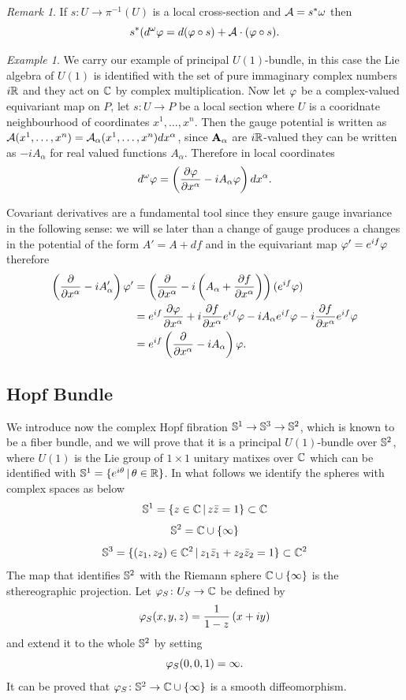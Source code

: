 \documentclass{article}
\theoremstyle{definition}
\theoremstyle{remark}
\newtheorem{rmk}{Remark}
\newtheorem{ex}{Example}
\begin{document}
\begin{rmk}
    If \(s\colon U\to\pi^{-1}(U)\) is a local cross-section and \(\mathcal{A}=s^*\omega\) then
    \[s^*(d^\omega\varphi=d(\varphi\circ s)+\mathcal{A}\cdot (\varphi\circ s).\]
\end{rmk}

\begin{ex}
    We carry our example of principal \(U(1)\)-bundle, in this case the Lie algebra of \(U(1)\) is identified with the set of pure immaginary complex numbers \(i\mathbb{R}\) and they act on \(\mathbb{C}\) by complex multiplication. Now let \(\varphi\) be a complex-valued equivariant map on \(P\), let \(s\colon U\to P\) be a local section where \(U\) is a cooridnate neighbourhood of coordinates \(x^1,\dots,x^n\). Then the gauge potential is written as \(\mathcal{A} (x^1,\dots,x^n)=\mathcal{A}_\alpha(x^1,\dots,x^n)dx^\alpha\), since \(\mathbf{A}_\alpha\) are \(i\mathbb{R}\)-valued they can be written as \(-iA_\alpha\) for real valued functions \(A_\alpha\).
    Therefore in local coordinates
    \[d^\omega\varphi=\left(\frac{\partial\varphi}{\partial x^\alpha}-iA_\alpha\varphi\right)dx^\alpha.\]
\end{ex}

Covariant derivatives are a fundamental tool since they ensure gauge invariance in the following sense: we will se later than a change of gauge produces a changes in the potential of the form \(A'= A+df\) and in the equivariant map \(\varphi'= e^{if}\varphi\) therefore
\[\begin{aligned}
    \left(\frac{\partial}{\partial x^\alpha}-iA_\alpha'\right)\varphi'
    & = \left(\frac{\partial}{\partial x^\alpha}-i\left(A_\alpha+\frac{\partial f}{\partial x^\alpha}\right)\right) (e^{if}\varphi) \\
    & = e^{if}\frac{\partial \varphi}{\partial x^\alpha} +i\frac{\partial f}{\partial x^\alpha}e^{if}\varphi -iA_\alpha e^{if}\varphi -i\frac{\partial f}{\partial x^\alpha}e^{if}\varphi \\
    & = e^{if}\left(\frac{\partial}{\partial x^\alpha}-iA_\alpha\right)\varphi.
\end{aligned}
\]

\subsection{Hopf Bundle}

We introduce now the complex Hopf fibration \(\mathbb{S}^1\to\mathbb{S}^3\to\mathbb{S}^2\), which is known to be a fiber bundle, and we will prove that it is a principal \(
U(1)\)-bundle over \(\mathbb{S}^2\), where \(U(1)\) is the Lie group of \(1\times 1\) unitary matixes over \(\mathbb{C}\) which can be identified with \(\mathbb{S}^1=\{e^{i\theta}\,|\,\theta\in\mathbb{R}\}\).
In what follows we identify the spheres with complex spaces as below
\[\mathbb{S}^1=\{z\in\mathbb{C}\,|\,z\bar{z}=1\}\subset \mathbb{C}\]
\[\mathbb{S}^2=\mathbb{C}\cup\{\infty\}\]
\[\mathbb{S}^3=\{(z_1,z_2)\in\mathbb{C}^2\,|\, z_1\bar{z}_1+z_2\bar{z}_2=1\}\subset\mathbb{C}^2\]
The map that identifies \(\mathbb{S}^2\) with the Riemann sphere \(\mathbb{C}\cup\{\infty\}\) is the sthereographic projection. Let \(\varphi_S\colon U_S\to\mathbb{C}\) be defined by
\[\varphi_S(x,y,z)=\frac{1}{1-z}\left(x+iy\right)\]
and extend it to the whole \(\mathbb{S}^2\) by setting
\[\varphi_S(0,0,1)=\infty.\]
It can be proved that \(\varphi_S\colon \mathbb{S}^2\to\mathbb{C}\cup\{\infty\}\) is a smooth diffeomorphism.
\end{document}
